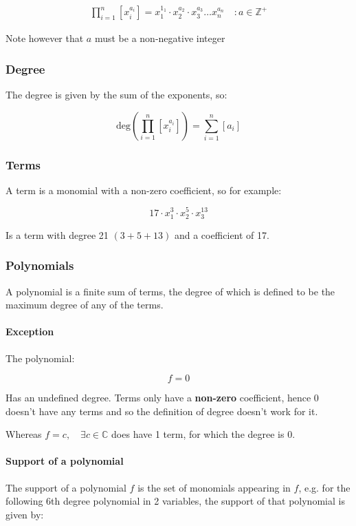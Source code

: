 \documentclass[a4paper,11pt,twoside]{article}
\begin{document}
\[ 
   \begin{aligned}
   \prod^n_{i=1} \left[ x_i^{a_i} \right] = x_1^{1_1} \cdot x_2^{a_2} \cdot
   x_3^{a_3} \ldots x_n^{a_n} \quad : a \in \mathbb{Z^+}
   \end{aligned}\]

Note however that \(a\) must be a non-negative integer \cite[p. 48]{e.h.connellElementsAbstractLinear2001}
\subsubsection{Degree}
\label{sec:orge5cdae5}
The degree is given by the sum of the exponents, so:

$$
    \mathrm{deg}\left(   \prod^n_{i=1} \left[ x_i^{a_i} \right]   \right) =
    \sum^{n}_{i= 1}   \left[ a_i \right] 
    $$

\subsubsection{Terms}
\label{sec:org64be36f}
A term is a monomial with a non-zero coefficient, so for example:

$$
    17 \cdot x_1^3 \cdot x_2^5 \cdot x_3^{13}
    $$

Is a term with degree 21 \((3+5+13)\) and a coefficient of 17.
\subsubsection{Polynomials}
\label{sec:org40fb533}
A polynomial is a finite sum of terms, the degree of which
is defined to be the maximum degree of any of the terms.

\paragraph{Exception}
\label{sec:org67a9d90}
The polynomial:

$$
     f = 0
     $$

Has an undefined degree. Terms only have a \textbf{non-zero} coefficient,
hence \(0\) doesn't have any terms and so the definition of degree
doesn't work for it.

Whereas \(f=c, \quad \exists c \in \mathbb{C}\) does have 1 term,
for which the degree is 0.

\paragraph{Support of a polynomial}
\label{sec:org406e844}
The support of a polynomial \(f\) is the set of monomials
appearing in \(f\), e.g. for the following 6th degree polynomial
in 2 variables, the support of that polynomial is given by:
\end{document}
